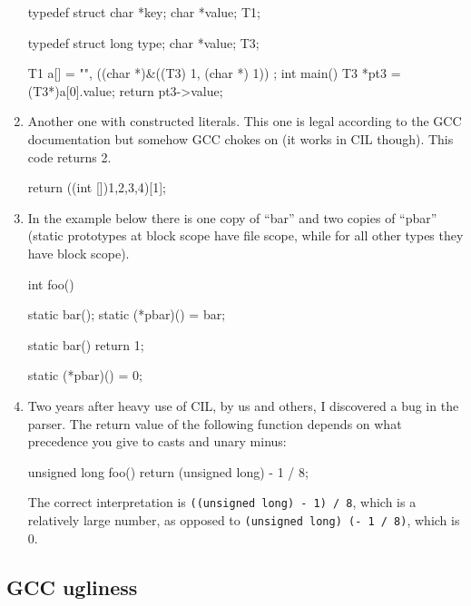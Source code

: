 \documentclass{article}
\def\t#1{{\tt #1}}
\begin{document}
\begin{enumerate}
\begin{cilcode}[global]
typedef struct
{
  char *key;
  char *value;
} T1;

typedef struct
{
  long type;
  char *value;
} T3;

T1 a[] =
{
  {
    "",
    ((char *)&((T3) {1, (char *) 1}))
  }
};
int main() {
   T3 *pt3 = (T3*)a[0].value;
   return pt3->value;
}
\end{cilcode}

\item Another one with constructed literals. This one is legal according to
the GCC documentation but somehow GCC chokes on (it works in CIL though). This
code returns 2.

\begin{cilcode}[local]
 return ((int []){1,2,3,4})[1];
\end{cilcode}

\item In the example below there is one copy of ``bar'' and two copies of
  ``pbar'' (static prototypes at block scope have file scope, while for all
  other types they have block scope).  

\begin{cilcode}[global]
  int foo() {
     static bar();
     static (*pbar)() = bar;

  }

  static bar() { 
    return 1;
  }

  static (*pbar)() = 0;
\end{cilcode}


\item Two years after heavy use of CIL, by us and others, I discovered a bug
  in the parser. The return value of the following function depends on what
  precedence you give to casts and unary minus:
\begin{cilcode}[global]
  unsigned long foo() {
    return (unsigned long) - 1 / 8;
  }
\end{cilcode}

  The correct interpretation is \t{((unsigned long) - 1) / 8}, which is a
  relatively large number, as opposed to \t{(unsigned long) (- 1 / 8)}, which
  is 0. 

\end{enumerate}

 \subsection{GCC ugliness}\label{sec-ugly-gcc}
\end{document}
